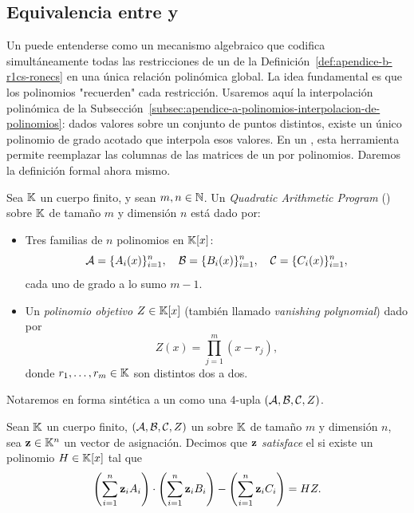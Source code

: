 
\subsection{Equivalencia entre \ROneCS y \QAP}
\label{subsec:apendice-b-qap-equivalencia-entre-ronecs-y-qap}

Un \QAP puede entenderse como un mecanismo algebraico que codifica simultáneamente todas las restricciones de un \ROneCS de la Definición~\ref{def:apendice-b-r1cs-ronecs} en una única relación polinómica global. La idea fundamental es que los polinomios "recuerden" cada restricción. Usaremos aquí la interpolación polinómica de la Subsección~\ref{subsec:apendice-a-polinomios-interpolacion-de-polinomios}: dados valores sobre un conjunto de puntos distintos, existe un único polinomio de grado acotado que interpola esos valores. En un \QAP, esta herramienta permite reemplazar las columnas de las matrices de un \ROneCS por polinomios. Daremos la definición formal ahora mismo.

\begin{definition}
\label{def:apendice-b-qap-qap-polinomio-objetivo}
	Sea $\mathbb{K}$ un cuerpo finito, y sean $m, n \in \mathbb{N}$. Un \emph{Quadratic Arithmetic Program} (\QAP) sobre $\mathbb{K}$ de tamaño $m$ y dimensión $n$ está dado por:
	\begin{itemize}[noitemsep]
		\item Tres familias de $n$ polinomios en $\mathbb{K}[x]$:
		$$\mathcal{A} = \{A_i(x)\}^n_{i=1}, \quad \mathcal{B} = \{B_i(x)\}^n_{i=1}, \quad \mathcal{C} = \{C_i(x)\}^n_{i=1},$$
		cada uno de grado a lo sumo $m - 1$.
		\item Un \emph{polinomio objetivo} $Z \in \mathbb{K}[x]$ (también llamado \emph{vanishing polynomial}) dado por
		$$Z(x) = \prod_{j=1}^{m}(x - r_j),$$
		donde $r_1, \ldots, r_m \in \mathbb{K}$ son distintos dos a dos.
	\end{itemize}
	Notaremos en forma sintética a un \QAP como una $4$-upla $\left(\mathcal{A}, \mathcal{B}, \mathcal{C}, Z\right)$.
\end{definition}

\begin{definition}
\label{def:apendice-b-qap-satisfaccion-de-un-qap}
	Sean $\mathbb{K}$ un cuerpo finito, $(\mathcal{A}, \mathcal{B}, \mathcal{C}, Z)$ un \QAP sobre $\mathbb{K}$ de tamaño $m$ y dimensión $n$, sea $\mathbf{z} \in \mathbb{K}^n$ un vector de asignación. Decimos que $\mathbf{z}$ \emph{satisface} el \QAP si existe un polinomio $H \in \mathbb{K}[x]$ tal que
	$$\left(\sum_{i=1}^{n} \mathbf{z}_i A_i\right) \cdot \left(\sum_{i=1}^{n} \mathbf{z}_i B_i \right) - \left(\sum_{i=1}^{n} \mathbf{z}_i C_i\right) = HZ.$$
\end{definition}

